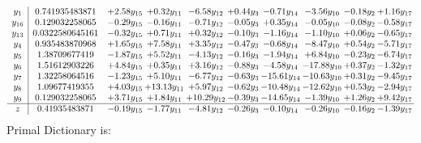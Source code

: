 \documentclass[9pt]{article}
\begin{document}
\[\begin{array}{c| c c@{\hskip 2pt} c@{\hskip 2pt} c@{\hskip 2pt} c@{\hskip 2pt} c@{\hskip 2pt} c@{\hskip 2pt} c@{\hskip 2pt} c@{\hskip 2pt} }
 y_{1}   &  0.741935483871 & +  2.58 y_{15} & +  0.32 y_{11} & -6.58 y_{12} & +  0.44 y_{3} & -0.71 y_{14} & -3.56 y_{10} & -0.18 y_{2} & +  1.16 y_{17}\\
 y_{16}   &  0.129032258065 & -0.29 y_{15} & -0.16 y_{11} & -0.71 y_{12} & -0.05 y_{3} & +  0.35 y_{14} & -0.05 y_{10} & -0.08 y_{2} & -0.58 y_{17}\\
 y_{13}   &  0.0322580645161 & -0.32 y_{15} & +  0.71 y_{11} & +  0.32 y_{12} & -0.10 y_{3} & -1.16 y_{14} & -1.10 y_{10} & +  0.06 y_{2} & -0.65 y_{17}\\
 y_{4}   &  0.935483870968 & +  1.65 y_{15} & +  7.58 y_{11} & +  3.35 y_{12} & -0.47 y_{3} & -0.68 y_{14} & -8.47 y_{10} & +  0.54 y_{2} & -5.71 y_{17}\\
 y_{5}   &  1.38709677419 & -1.87 y_{15} & +  5.52 y_{11} & -4.13 y_{12} & -0.16 y_{3} & -1.94 y_{14} & +  6.84 y_{10} & -0.23 y_{2} & -6.74 y_{17}\\
 y_{6}   &  1.51612903226 & +  4.84 y_{15} & +  0.35 y_{11} & +  3.16 y_{12} & -0.88 y_{3} & -4.58 y_{14} & -17.88 y_{10} & +  0.37 y_{2} & -1.32 y_{17}\\
 y_{7}   &  1.32258064516 & -1.23 y_{15} & +  5.10 y_{11} & -6.77 y_{12} & -0.63 y_{3} & -15.61 y_{14} & -10.63 y_{10} & +  0.31 y_{2} & -9.45 y_{17}\\
 y_{8}   &  1.09677419355 & +  4.03 y_{15} & + 13.13 y_{11} & +  5.97 y_{12} & -0.62 y_{3} & -10.48 y_{14} & -12.62 y_{10} & +  0.53 y_{2} & -2.94 y_{17}\\
 y_{9}   &  0.129032258065 & +  3.71 y_{15} & +  1.84 y_{11} & + 10.29 y_{12} & -0.39 y_{3} & -14.65 y_{14} & -1.39 y_{10} & +  1.26 y_{2} & +  9.42 y_{17}\\
\hline
z    &  0.41935483871 & -0.19 y_{15} & -1.77 y_{11} & -4.81 y_{12} & -0.26 y_{3} & -0.10 y_{14} & -0.26 y_{10} & -0.16 y_{2} & -1.39 y_{17}\\
\end{array}\]
Primal Dictionary is:
\end{document}
